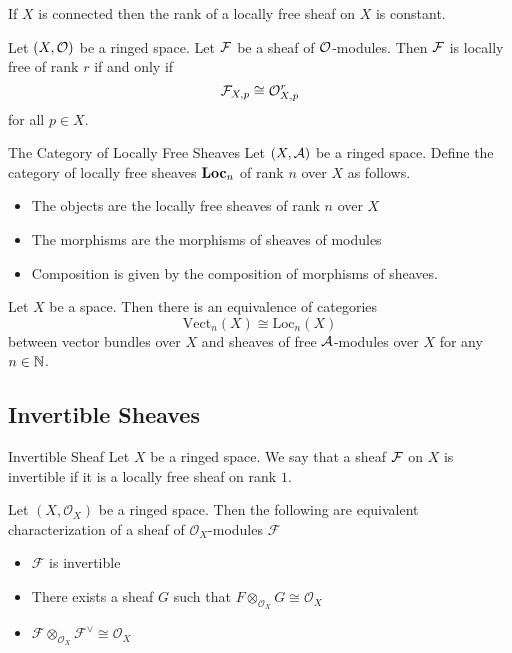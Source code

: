 \documentclass[a4paper]{article}
\begin{document}
\begin{lmm}{}{} If $X$ is connected then the rank of a locally free sheaf on $X$ is constant. 
\end{lmm}

\begin{prp}{}{} Let $(X,\mathcal{O})$ be a ringed space. Let $\mathcal{F}$ be a sheaf of $\mathcal{O}$-modules. Then $\mathcal{F}$ is locally free of rank $r$ if and only if $$\mathcal{F}_{X,p}\cong\mathcal{O}_{X,p}^r$$ for all $p\in X$. 
\end{prp}

\begin{defn}{The Category of Locally Free Sheaves}{} Let $(X,\mathcal{A})$ be a ringed space. Define the category of locally free sheaves $\bold{Loc}_n$ of rank $n$ over $X$ as follows. 
\begin{itemize}
\item The objects are the locally free sheaves of rank $n$ over $X$
\item The morphisms are the morphisms of sheaves of modules
\item Composition is given by the composition of morphisms of sheaves. 
\end{itemize}
\end{defn}

\begin{thm}{}{} Let $X$ be a space. Then there is an equivalence of categories $$\text{Vect}_n(X)\cong\text{Loc}_n(X)$$ between vector bundles over $X$ and sheaves of free $\mathcal{A}$-modules over $X$ for any $n\in\mathbb{N}$. 
\end{thm}

\subsection{Invertible Sheaves}
\begin{defn}{Invertible Sheaf}{} Let $X$ be a ringed space. We say that a sheaf $\mathcal{F}$ on $X$ is invertible if it is a locally free sheaf on rank $1$. 
\end{defn}

\begin{thm}{}{} Let $(X,\mathcal{O}_X)$ be a ringed space. Then the following are equivalent characterization of a sheaf of $\mathcal{O}_X$-modules $\mathcal{F}$
\begin{itemize}
\item $\mathcal{F}$ is invertible
\item There exists a sheaf $G$ such that $F\otimes_{\mathcal{O}_X}G\cong\mathcal{O}_X$
\item $\mathcal{F}\otimes_{\mathcal{O}_X}\mathcal{F}^{\vee}\cong\mathcal{O}_X$
\end{itemize}
\end{thm}
\end{document}
